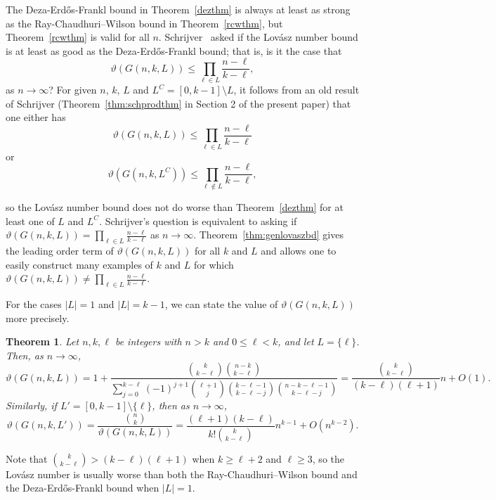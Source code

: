 \documentclass[11pt]{article}
\newtheorem{theorem}{Theorem}[section]
\theoremstyle{definition}
\theoremstyle{remark}
\begin{document}
The Deza-Erd\H{o}s-Frankl bound in Theorem~\ref{dezthm} is always at least as strong as the Ray-Chaudhuri--Wilson bound in Theorem~\ref{rcwthm}, but Theorem~\ref{rcwthm} is valid for all $n$. Schrijver~\cite[Equation (54)]{Sch1978} asked if the Lov\'asz number bound is at least as good as the Deza-Erd\H{o}s-Frankl bound; that is, is it the case that
\[\vartheta(G(n, k, L)) \le \prod_{\ell \in L}\frac{n-\ell}{k-\ell},\]
as $n\rightarrow \infty$?  For given $n$, $k$, $L$ and $L^C = [0, k-1] \setminus L$, it follows from an old result of Schrijver (Theorem~\ref{thm:schprodthm} in Section 2 of the present paper) that one either has 
\[\vartheta(G(n, k, L)) \le \prod_{\ell \in L}\frac{n-\ell}{k-\ell}\]
or 
\[\vartheta(G(n, k, L^C)) \le \prod_{\ell \notin L} \frac{n-\ell}{k-\ell},\]

so the Lov\'asz number bound does not do worse than Theorem~\ref{dezthm} for at least one of $L$ and $L^C$. Schrijver's question is equivalent to asking if $\vartheta(G(n, k, L)) = \prod_{\ell \in L}\frac{n-\ell}{k-\ell}$ as $n\rightarrow \infty$. Theorem~\ref{thm:genlovaszbd} gives the leading order term of $\vartheta(G(n, k, L))$ for all $k$ and $L$ and allows one to easily construct many examples of $k$ and $L$ for which $\vartheta(G(n, k, L)) \neq  \prod_{\ell \in L}\frac{n-\ell}{k-\ell}$.



For the cases $|L| = 1$ and $|L| = k-1$, we can state the value of $\vartheta(G(n, k, L))$ more precisely. 

\begin{theorem}\label{thm:exactL=1}
Let $n, k, \ell$ be integers with $n > k$ and $0\le \ell < k$, and let $L = \{\ell\}$. Then, as $n\rightarrow \infty$, 
\[\vartheta(G(n, k, L)) = 1 + \frac{\binom{k}{k-\ell}\binom{n-k}{k-\ell}}{\sum_{j=0}^{k-\ell}(-1)^{j+1}\binom{\ell+1}{j}\binom{k-\ell-1}{k-\ell-j}\binom{n-k-\ell-1}{k-\ell-j}} = \frac{\binom{k}{k-\ell}}{(k-\ell)(\ell+1)} n + O(1).\]
Similarly, if $L' = [0, k-1]\setminus \{\ell\}$, then as $n\rightarrow \infty$,
\[\vartheta(G(n, k, L')) = \frac{\binom{n}{k}}{\vartheta(G(n, k, L)) } = \frac{(\ell+1)(k-\ell)}{k!\binom{k}{k-\ell}}n^{k-1} + O(n^{k-2}).\]
\end{theorem}

Note that $\binom{k}{k-\ell} > (k-\ell)(\ell+1) $ when $k\ge \ell+2$ and  $\ell \ge 3$, so the Lov\'asz number is usually worse than both the Ray-Chaudhuri--Wilson bound and the Deza-Erd\H{o}s-Frankl bound when $|L| = 1$.  
\end{document}

